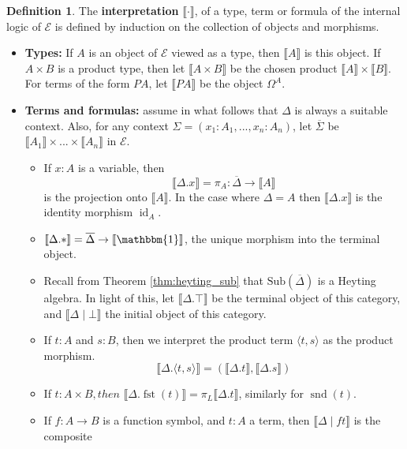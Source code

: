 \documentclass{birkjour}
\theoremstyle{plain}
\theoremstyle{definition}
\newtheorem{definition}[thm]{Definition} %
\newcommand{\call}[1]{\mathcal{#1}}
\begin{document}
	\begin{definition}
		\label{def:interpretation}
		The \textbf{interpretation} $\llbracket \cdot \rrbracket$, of a type, term or formula of the internal logic of $\call{E}$ is defined by induction on the collection of objects and morphisms.
		\begin{itemize}
			\item \textbf{Types:} If $A$ is an object of $\call{E}$ viewed as a type, then $\llbracket A \rrbracket$ is this object. If $A \times B$ is a product type, then let $\llbracket A \times B \rrbracket$ be the chosen product $\llbracket A \rrbracket \times \llbracket B \rrbracket$. For terms of the form $PA$, let $\llbracket PA \rrbracket$ be the object $\Omega^A$.
			\item \textbf{Terms and formulas:} assume in what follows that $\Delta$ is always a suitable context. Also, for any context $\Sigma = (x_1:A_1,...,x_n:A_n)$, let $\overline{\Sigma}$ be $\llbracket A_1\rrbracket \times ... \times \llbracket A_n\rrbracket$ in $\call{E}$.
			\begin{itemize}
				\item If $x:A$ is a variable, then 
				$$\llbracket \Delta . x\rrbracket = \pi_A: \overline{\Delta} \to \llbracket A\rrbracket$$
				is the projection onto $\llbracket A\rrbracket$. In the case where $\Delta = A$ then $\llbracket \Delta . x\rrbracket$ is the identity morphism $\operatorname{id}_A$.
				\item $\llbracket \Delta . \ast \rrbracket = \overline{\Delta} \to \llbracket\mathbbm{1}\rrbracket$, the unique morphism into the terminal object.
				\item Recall from Theorem \ref{thm:heyting_sub} that $\text{Sub}(\overline{\Delta})$ is a Heyting algebra. In light of this, let $\llbracket \Delta . \top \rrbracket$ be the terminal object of this category, and $\llbracket \Delta \mid \bot \rrbracket$ the initial object of this category.
				\item If $t: A$ and $s: B$, then we interpret the product term $\langle t, s \rangle$ as the product morphism.
				$$\llbracket \Delta . \langle t,s \rangle \rrbracket = ( \llbracket \Delta . t \rrbracket, \llbracket \Delta . s \rrbracket )$$
				\item If $t: A \times B, then $ $\llbracket \Delta . \operatorname{fst}(t)\rrbracket = \pi_L\llbracket\Delta . t \rrbracket$, similarly for $\operatorname{snd}(t)$.
				\item If $f:A \to B$ is a function symbol, and $t:A$ a term, then $\llbracket \Delta \mid ft \rrbracket$ is the composite

\end{itemize}
\end{itemize}
\end{definition}
\end{document}
